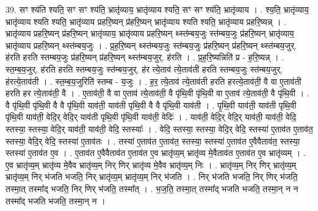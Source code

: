 \documentclass[17pt]{extarticle}
\begin{document}
39. सꣳ श्य॑ति श्यति॒ सꣳ सꣳ श्य॑ति॒ भ्रातृ॑व्याय॒ भ्रातृ॑व्याय श्यति॒ सꣳ सꣳ श्य॑ति॒ भ्रातृ॑व्याय । . श्य॒ति॒ भ्रातृ॑व्याय॒ भ्रातृ॑व्याय श्यति श्यति॒ भ्रातृ॑व्याय प्रहरि॒ष्यन् प्र॑हरि॒ष्यन् भ्रातृ॑व्याय श्यति श्यति॒ भ्रातृ॑व्याय प्रहरि॒ष्यन्न् । . भ्रातृ॑व्याय प्रहरि॒ष्यन् प्र॑हरि॒ष्यन् भ्रातृ॑व्याय॒ भ्रातृ॑व्याय प्रहरि॒ष्यन् थ्स्त॑म्बय॒जुः स्त॑म्बय॒जुः प्र॑हरि॒ष्यन् भ्रातृ॑व्याय॒ भ्रातृ॑व्याय प्रहरि॒ष्यन् थ्स्त॑म्बय॒जुः । . प्र॒ह॒रि॒ष्यन् थ्स्त॑म्बय॒जुः स्त॑म्बय॒जुः प्र॑हरि॒ष्यन् प्र॑हरि॒ष्यन् थ्स्त॑म्बय॒जुर्. ह॑रति हरति स्तम्बय॒जुः प्र॑हरि॒ष्यन् प्र॑हरि॒ष्यन् थ्स्त॑म्बय॒जुर्. ह॑रति । . प्र॒ह॒रि॒ष्यन्निति॑ प्र - ह॒रि॒ष्यन्न् । . स्त॒म्ब॒य॒जुर्. ह॑रति हरति स्तम्बय॒जुः स्त॑म्बय॒जुर्. ह॑र त्ये॒ताव॑ त्ये॒ताव॑ती हरति स्तम्बय॒जुः स्त॑म्बय॒जुर्. ह॑रत्ये॒ताव॑ती । . स्त॒म्ब॒य॒जुरिति॑ स्तम्ब - य॒जुः । . ह॒र॒ त्ये॒ताव॑ त्ये॒ताव॑ती हरति हरत्ये॒ताव॑ती॒ वै वा ए॒ताव॑ती हरति हर त्ये॒ताव॑ती॒ वै । . ए॒ताव॑ती॒ वै वा ए॒ताव॑ त्ये॒ताव॑ती॒ वै पृ॑थि॒वी पृ॑थि॒वी वा ए॒ताव॑ त्ये॒ताव॑ती॒ वै पृ॑थि॒वी । . वै पृ॑थि॒वी पृ॑थि॒वी वै वै पृ॑थि॒वी याव॑ती॒ याव॑ती पृथि॒वी वै वै पृ॑थि॒वी याव॑ती । . पृ॒थि॒वी याव॑ती॒ याव॑ती पृथि॒वी पृ॑थि॒वी याव॑ती॒ वेदि॒र् वेदि॒र् याव॑ती पृथि॒वी पृ॑थि॒वी याव॑ती॒ वेदिः॑ । . याव॑ती॒ वेदि॒र् वेदि॒र् याव॑ती॒ याव॑ती॒ वेदि॒ स्तस्या॒ स्तस्या॒ वेदि॒र् याव॑ती॒ याव॑ती॒ वेदि॒ स्तस्याः᳚ । . वेदि॒ स्तस्या॒ स्तस्या॒ वेदि॒र् वेदि॒ स्तस्या॑ ए॒ताव॑त ए॒ताव॑त॒ स्तस्या॒ वेदि॒र् वेदि॒ स्तस्या॑ ए॒ताव॑तः । . तस्या॑ ए॒ताव॑त ए॒ताव॑त॒ स्तस्या॒ स्तस्या॑ ए॒ताव॑त ए॒वैवैताव॑त॒ स्तस्या॒ स्तस्या॑ ए॒ताव॑त ए॒व । . ए॒ताव॑त ए॒वैवैताव॑त ए॒ताव॑त ए॒व भ्रातृ॑व्य॒म् भ्रातृ॑व्य मे॒वैताव॑त ए॒ताव॑त ए॒व भ्रातृ॑व्यम् । . ए॒व भ्रातृ॑व्य॒म् भ्रातृ॑व्य मे॒वैव भ्रातृ॑व्य॒म् निर् णिर् भ्रातृ॑व्य मे॒वैव भ्रातृ॑व्य॒म् निः । . भ्रातृ॑व्य॒म् निर् णिर् भ्रातृ॑व्य॒म् भ्रातृ॑व्य॒म् निर् भ॑जति भजति॒ निर् भ्रातृ॑व्य॒म् भ्रातृ॑व्य॒म् निर् भ॑जति । . निर् भ॑जति भजति॒ निर् णिर् भ॑जति॒ तस्मा॒त् तस्मा᳚द् भजति॒ निर् णिर् भ॑जति॒ तस्मा᳚त् । . भ॒ज॒ति॒ तस्मा॒त् तस्मा᳚द् भजति भजति॒ तस्मा॒न् न न तस्मा᳚द् भजति भजति॒ तस्मा॒न् न । \newline
\pagebreak
{}
\end{document}
